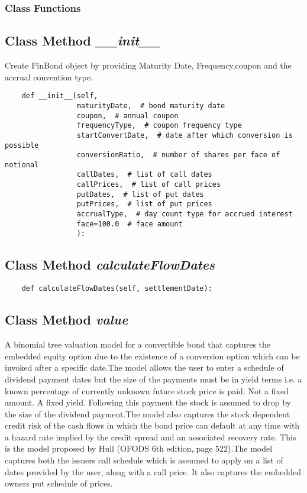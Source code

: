 \documentclass[twoside,11pt]{book}
\begin{document}
\subsubsection{Class Functions}

\subsection{Class Method {\it \_\_init\_\_}}
Create FinBond object by providing Maturity Date, Frequency,coupon and the accrual convention type. 

\begin{lstlisting}
    def __init__(self,
                 maturityDate,  # bond maturity date
                 coupon,  # annual coupon
                 frequencyType,  # coupon frequency type
                 startConvertDate,  # date after which conversion is possible
                 conversionRatio,  # number of shares per face of notional
                 callDates,  # list of call dates
                 callPrices,  # list of call prices
                 putDates,  # list of put dates
                 putPrices,  # list of put prices
                 accrualType,  # day count type for accrued interest
                 face=100.0  # face amount
                 ):
\end{lstlisting}

\subsection{Class Method {\it calculateFlowDates}}


\begin{lstlisting}
    def calculateFlowDates(self, settlementDate):
\end{lstlisting}

\subsection{Class Method {\it value}}
A binomial tree valuation model for a convertible bond that captures the embedded equity option due to the existence of a conversion option which can be invoked after a specific date.The model allows the user to enter a schedule of dividend payment dates but the size of the payments must be in yield terms i.e. a known percentage of currently unknown future stock price is paid. Not a fixed amount. A fixed yield. Following this payment the stock is assumed to drop by the size of the dividend payment.The model also captures the stock dependent credit risk of the cash flows in which the bond price can default at any time with a hazard rate implied by the credit spread and an associated recovery rate. This is the model proposed by Hull (OFODS 6th edition,.page 522).The model captures both the issuers call schedule which is assumed to apply on a list of dates provided by the user, along with a call price. It also captures the embedded owners put schedule of prices.
\end{document}
